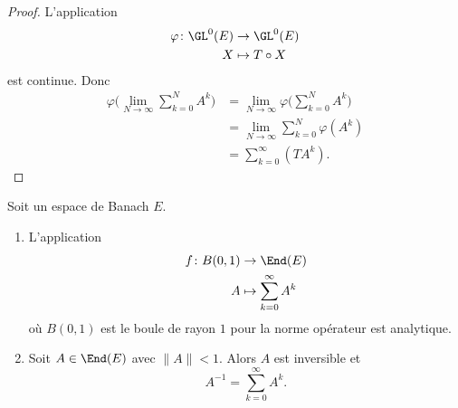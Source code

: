 \begin{proof}
	L'application
	\begin{equation}
		\begin{aligned}
			\varphi\colon \GL^0(E) & \to \GL^0(E)     \\
			X                      & \mapsto T\circ X
		\end{aligned}
	\end{equation}
	est continue. Donc
	\begin{subequations}
		\begin{align}
			\varphi\Big( \lim_{N\to \infty}\sum_{k=0}^{N}A^k \Big) & =\lim_{N\to \infty}\varphi\Big( \sum_{k=0}^NA^k \Big) \\
			                                                       & =\lim_{N\to \infty}\sum_{k=0}^N\varphi(A^k)           \\
			                                                       & =\sum_{k=0}^{\infty}(TA^k).
		\end{align}
	\end{subequations}
\end{proof}

\begin{proposition}	\label{PROPooPVZBooESAiRv}
	Soit un espace de Banach \( E\).

	\begin{enumerate}
		\item
		      L'application
		      \begin{equation}
			      \begin{aligned}
				      f\colon B(0,1) & \to \End(E)                    \\
				      A              & \mapsto \sum_{k=0}^{\infty}A^k
			      \end{aligned}
		      \end{equation}
		      où \( B(0,1)\) est le boule de rayon \( 1\) pour la norme opérateur est analytique.
		\item
		      Soit \( A\in \End(E)\) avec \( \| A \|<1\). Alors \( A\) est inversible et
		      \begin{equation}
			      A^{-1}=\sum_{k=0}^{\infty}A^k.
		      \end{equation}
	\end{enumerate}
\end{proposition}

